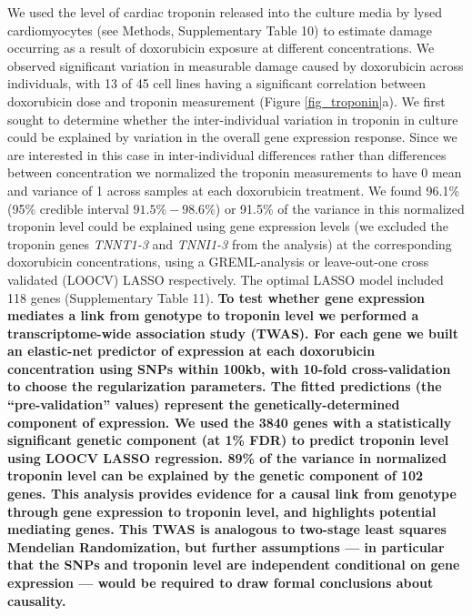 \documentclass{article}
\newcommand{\tempbold}[1]{\textbf{#1}}
\begin{document}
We used the level of cardiac troponin released into the culture media by lysed cardiomyocytes (see Methods, Supplementary Table 10) to estimate damage occurring as a result of doxorubicin exposure at different concentrations. We observed significant variation in measurable damage caused by doxorubicin across individuals, with 13 of 45 cell lines having a significant correlation between doxorubicin dose and troponin measurement (Figure \ref{fig_troponin}a). We first sought to determine whether the inter-individual variation in troponin in culture could be explained by variation in the overall gene expression response. Since we are interested in this case in inter-individual differences rather than differences between concentration we normalized the troponin measurements to have 0 mean and variance of 1 across samples at each doxorubicin treatment. We found 96.1\% (95\% credible interval $91.5\%  - 98.6\%$) or 91.5\% of the variance in this normalized troponin level could be explained using gene expression levels (we excluded the troponin genes \emph{TNNT1-3} and \emph{TNNI1-3} from the analysis) at the corresponding doxorubicin concentrations, using a GREML-analysis\cite{Yang2010-cx} or leave-out-one cross validated (LOOCV) LASSO\cite{tibshirani1996regression} respectively. The optimal LASSO model included 118 genes (Supplementary Table 11). \tempbold{To test whether gene expression mediates a link from genotype to troponin level we performed a transcriptome-wide association study\cite{Gamazon2015-ij} (TWAS). For each gene we built an elastic-net predictor of expression at each doxorubicin concentration using SNPs within 100kb, with 10-fold cross-validation to choose the regularization parameters. The fitted predictions (the ``pre-validation'' values) represent the genetically-determined component of expression. We used the 3840 genes with a statistically significant genetic component (at 1\% FDR) to predict troponin level using LOOCV LASSO regression. 89\% of the variance in normalized troponin level can be explained by the genetic component of 102 genes. This analysis provides evidence for a causal link from genotype through gene expression to troponin level, and highlights potential mediating genes. This TWAS is analogous to two-stage least squares Mendelian Randomization\cite{Angrist1995-kp}, but further assumptions --- in particular that the SNPs and troponin level are independent conditional on gene expression --- would be required to draw formal conclusions about causality.}
\end{document}
